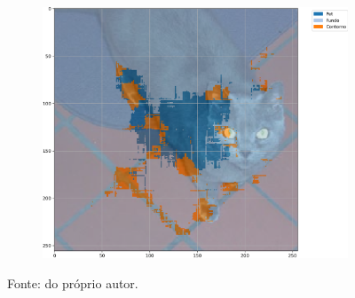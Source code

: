 \begin{figure}[H]
\begin{subfigure}[t]{0.32\textwidth}
         \label{results:fig:semantic:13.2}
     \end{subfigure}%
     ~ 
    \begin{subfigure}[t]{0.32\textwidth}
         \centering
         \includegraphics[width=1\linewidth]{recursos/imagens/results/max_miou_unetlike500_image_2_overlayed_segmentation.png}
         \label{results:fig:semantic:13.3}
     \end{subfigure}%

    Fonte: do próprio autor.
\end{figure}

